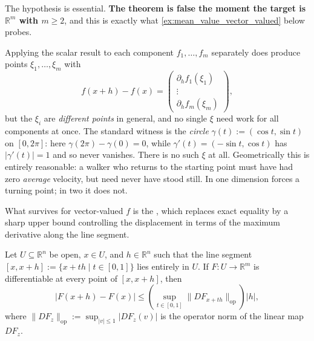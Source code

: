 \begin{importantremark}
\label{rem:mvt_fails_vector_valued}
The hypothesis  is essential. \textbf{The theorem is false the moment
the target is $\mathbb{R}^m$ with $m \geq 2$}, and this is exactly what \cref{ex:mean_value_vector_valued} below
probes.

Applying the scalar result to each component $f_1,\dots,f_m$ separately does produce points
$\xi_1,\dots,\xi_m$ with
\[f(x+h)-f(x) = \begin{pmatrix}\partial_hf_1(\xi_1) \\ \vdots \\ \partial_hf_m(\xi_m)\end{pmatrix},\]
but the $\xi_i$ are \emph{different points} in general, and no single $\xi$ need work for all
components at once. The standard witness is the \emph{circle}
$\gamma(t) := (\cos t, \sin t)$ on $[0,2\pi]$: here $\gamma(2\pi)-\gamma(0) = 0$, while
$\gamma'(t) = (-\sin t,\cos t)$ has $|\gamma'(t)| = 1$ and so never vanishes. There is no such
$\xi$ at all. Geometrically this is entirely reasonable: a walker who returns to the starting
point must have had zero \emph{average} velocity, but need never have stood still. In one
dimension  forces a turning point; in two it does not.

What survives for vector-valued $f$ is the  , which replaces exact equality by a sharp upper bound controlling the displacement in terms of the maximum derivative along the line segment.
\end{importantremark}

\begin{theorem}
\label{thm:mean_value_inequality}
Let $U \subseteq \mathbb{R}^n$ be open, $x \in U$, and $h \in \mathbb{R}^n$ such that the line segment $[x, x+h] := \{x + th \mid t \in [0,1]\}$ lies entirely in $U$. If $F : U \to \mathbb{R}^m$ is differentiable at every point of $[x, x+h]$, then
\[
|F(x+h) - F(x)| \leq \left( \sup_{t \in [0,1]} \|DF_{x+th}\|_{\mathrm{op}} \right) |h|,
\]
where $\|DF_z\|_{\mathrm{op}} := \sup_{|v|\leq 1} |DF_z(v)|$ is the operator norm of the linear map $DF_z$.
\end{theorem}

